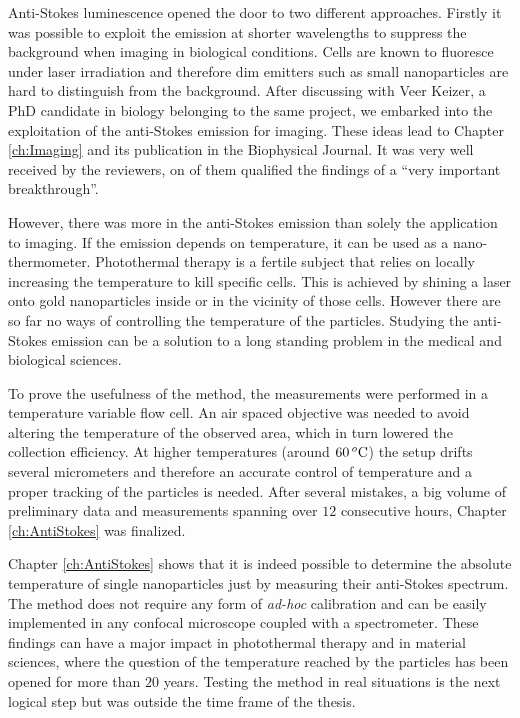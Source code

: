Anti-Stokes luminescence opened the door to two different approaches. Firstly it
was possible to exploit the emission at shorter wavelengths to suppress the
background when imaging in biological conditions. Cells are known to fluoresce
under laser irradiation and therefore dim emitters such as small nanoparticles
are hard to distinguish from the background. After discussing with Veer Keizer,
a PhD candidate in biology belonging to the same project, we embarked into the
exploitation of the anti-Stokes emission for imaging. These ideas lead to
Chapter \ref{ch:Imaging} and its publication in the Biophysical Journal. It was
very well received by the reviewers, on of them qualified the findings of
a ``very important breakthrough''.

However, there was more in the anti-Stokes emission than solely the application
to imaging. If the emission depends on temperature, it can be used as a
nano-thermometer. Photothermal therapy is a fertile subject that relies on
locally increasing the temperature to kill specific cells. This is achieved by
shining a laser onto gold nanoparticles inside or in the vicinity of those
cells. However there are so far no ways of controlling the temperature of the
particles. Studying the anti-Stokes emission can be a solution to a long
standing problem in the medical and biological sciences.

To prove the usefulness of the method, the measurements were performed in a
temperature variable flow cell. An air spaced objective was needed to avoid
altering the temperature of the observed area, which in turn lowered the
collection efficiency. At higher temperatures (around $60\,^o\textrm{C}$) the setup
drifts several micrometers and therefore an accurate control of temperature and
a proper tracking of the particles is needed. After several mistakes, a big
volume of preliminary data and measurements spanning over $12$ consecutive
hours, Chapter \ref{ch:AntiStokes} was finalized. 

Chapter \ref{ch:AntiStokes} shows that it is indeed possible to determine the
absolute temperature of single nanoparticles just by measuring their anti-Stokes
spectrum. The method does not require any form of \textit{ad-hoc} calibration
and can be easily implemented in any confocal microscope coupled with a
spectrometer. These findings can have a major impact in photothermal therapy and
in material sciences, where the question of the temperature reached by the
particles has been opened for more than $20$ years. Testing the method in real
situations is the next logical step but was outside the time frame of the
thesis.

